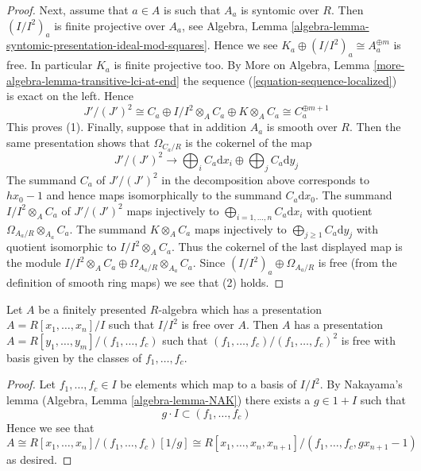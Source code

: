 \begin{proof}
\medskip\noindent
Next, assume that $a \in A$ is such that $A_a$ is syntomic over $R$.
Then $(I/I^2)_a$ is finite projective over $A_a$, see
Algebra, Lemma \ref{algebra-lemma-syntomic-presentation-ideal-mod-squares}.
Hence we see $K_a \oplus (I/I^2)_a \cong A_a^{\oplus m}$ is free.
In particular $K_a$ is finite projective too.
By More on Algebra, Lemma \ref{more-algebra-lemma-transitive-lci-at-end}
the sequence (\ref{equation-sequence-localized}) is exact on the left.
Hence
$$
J'/(J')^2 \cong
C_a \oplus I/I^2 \otimes_A C_a \oplus K \otimes_A C_a \cong
C_a^{\oplus m + 1}
$$
This proves (1). Finally, suppose that in addition $A_a$ is smooth over
$R$. Then the same presentation shows that $\Omega_{C_a/R}$
is the cokernel of the map
$$
J'/(J')^2 \longrightarrow
\bigoplus\nolimits_i C_a\text{d}x_i \oplus \bigoplus\nolimits_j C_a\text{d}y_j
$$
The summand $C_a$ of $J'/(J')^2$ in the decomposition above
corresponds to $hx_0 - 1$ and hence maps
isomorphically to the summand $C_a\text{d}x_0$. The summand
$I/I^2 \otimes_A C_a$ of $J'/(J')^2$ maps injectively to
$\bigoplus_{i = 1, \ldots, n} C_a\text{d}x_i$
with quotient $\Omega_{A_a/R} \otimes_{A_a} C_a$. The summand
$K \otimes_A C_a$ maps injectively to
$\bigoplus_{j \geq 1} C_a\text{d}y_j$ with quotient isomorphic to
$I/I^2 \otimes_A C_a$. Thus the cokernel of the last displayed
map is the module
$I/I^2 \otimes_A C_a \oplus \Omega_{A_a/R} \otimes_{A_a} C_a$.
Since $(I/I^2)_a \oplus \Omega_{A_a/R}$ is
free (from the definition of smooth ring maps) we see that (2) holds.
\end{proof}

\begin{lemma}
\label{lemma-huber}
Let $A$ be a finitely presented $R$-algebra which has a presentation
$A = R[x_1, \ldots, x_n]/I$ such that $I/I^2$ is free over $A$. Then
$A$ has a presentation $A = R[y_1, \ldots, y_m]/(f_1, \ldots, f_c)$
such that $(f_1, \ldots, f_c)/(f_1, \ldots, f_c)^2$ is free with
basis given by the classes of $f_1, \ldots, f_c$.
\end{lemma}

\begin{proof}
Let $f_1, \ldots, f_c \in I$ be elements which map to a basis of
$I/I^2$. By Nakayama's lemma (Algebra, Lemma \ref{algebra-lemma-NAK})
there exists a $g \in 1 + I$ such that
$$
g \cdot I \subset (f_1, \ldots, f_c)
$$
Hence we see that
$$
A \cong R[x_1, \ldots, x_n]/(f_1, \ldots, f_c)[1/g]
\cong R[x_1, \ldots, x_n, x_{n + 1}]/(f_1, \ldots, f_c, gx_{n + 1} - 1)
$$
as desired.
\end{proof}

